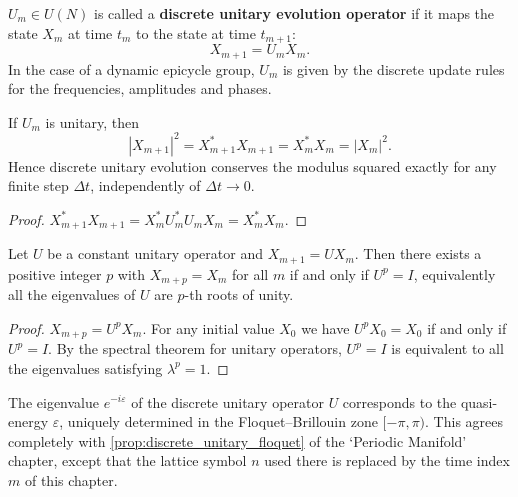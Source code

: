 \begin{definition}\label{def:dyn_discrete_unitary_operator}
$U_m\in U(N)$ is called a \textbf{discrete unitary evolution operator} if it maps the state $X_m$ at time $t_m$ to the state at time $t_{m+1}$:
\[
X_{m+1}=U_mX_m.
\]
In the case of a dynamic epicycle group, $U_m$ is given by the discrete update rules for the frequencies, amplitudes and phases.
\end{definition}

\begin{proposition}\label{prop:dyn_discrete_unitary_norm}
If $U_m$ is unitary, then
\[
|X_{m+1}|^2=X_{m+1}^\ast X_{m+1}=X_m^\ast X_m=|X_m|^2.
\]
Hence discrete unitary evolution conserves the modulus squared exactly for any finite step $\Delta t$, independently of $\Delta t\to 0$.
\end{proposition}

\begin{proof}
$X_{m+1}^\ast X_{m+1}=X_m^\ast U_m^\ast U_mX_m=X_m^\ast X_m$.
\end{proof}

\begin{theorem}\label{thm:dyn_discrete_period_condition}
Let $U$ be a constant unitary operator and $X_{m+1}=UX_m$. Then there exists a positive integer $p$ with $X_{m+p}=X_m$ for all $m$ if and only if $U^p=I$, equivalently all the eigenvalues of $U$ are $p$-th roots of unity.
\end{theorem}

\begin{proof}
$X_{m+p}=U^pX_m$. For any initial value $X_0$ we have $U^pX_0=X_0$ if and only if $U^p=I$. By the spectral theorem for unitary operators, $U^p=I$ is equivalent to all the eigenvalues satisfying $\lambda^p=1$.
\end{proof}

\begin{corollary}\label{cor:dyn_discrete_floquet}
The eigenvalue $e^{-i\varepsilon}$ of the discrete unitary operator $U$ corresponds to the quasi-energy $\varepsilon$, uniquely determined in the Floquet--Brillouin zone $[-\pi,\pi)$. This agrees completely with \cref{prop:discrete_unitary_floquet} of the `Periodic Manifold' chapter, except that the lattice symbol $n$ used there is replaced by the time index $m$ of this chapter.
\end{corollary}

